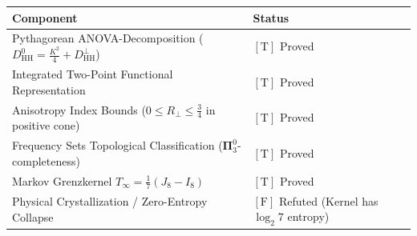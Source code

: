 \documentclass[11pt,a4paper]{article}
\begin{document}
\begin{center}
\begin{tabular}{l|l}
\hline
\textbf{Component} & \textbf{Status} \\ \hline
Pythagorean ANOVA-Decomposition ($D_{\mathrm{HH}}^0 = \frac{K^2}{4} + D_{\mathrm{HH}}^\perp$) & $[\mathrm{T}]$ Proved \\
Integrated Two-Point Functional Representation & $[\mathrm{T}]$ Proved \\
Anisotropy Index Bounds ($0 \le R_\perp \le \frac{3}{4}$ in positive cone) & $[\mathrm{T}]$ Proved \\
Frequency Sets Topological Classification ($\mathbf{\Pi}^0_3$-completeness) & $[\mathrm{T}]$ Proved \\
Markov Grenzkernel $T_\infty = \frac{1}{7}(J_8 - I_8)$ & $[\mathrm{T}]$ Proved \\
Physical Crystallization / Zero-Entropy Collapse & $[\mathrm{F}]$ Refuted (Kernel has $\log_2 7$ entropy) \\ \hline
\end{tabular}
\end{center}
\end{document}
